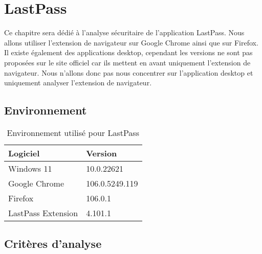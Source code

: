 
\chapter{LastPass}
\label{ch:lastpass}

Ce chapitre sera dédié à l'analyse sécuritaire de l'application LastPass. Nous allons utiliser l'extension de navigateur sur Google Chrome ainsi que sur Firefox. Il existe également des applications desktop, cependant les versions ne sont pas proposées sur le site officiel car ils mettent en avant uniquement l'extension de navigateur. Nous n'allons donc pas nous concentrer sur l'application desktop et uniquement analyser l'extension de navigateur. 

\section{Environnement}

\begin{table}[H]
	\centering
	\begin{tabular}{ll}
		\hline
		Logiciel           & Version        \\ \hline
		Windows 11         & 10.0.22621     \\
		Google Chrome      & 106.0.5249.119 \\
		Firefox            & 106.0.1        \\
		LastPass Extension & 4.101.1        \\ \hline
	\end{tabular}
\caption{Environnement utilisé pour LastPass}
\end{table}

\section{Critères d'analyse}
